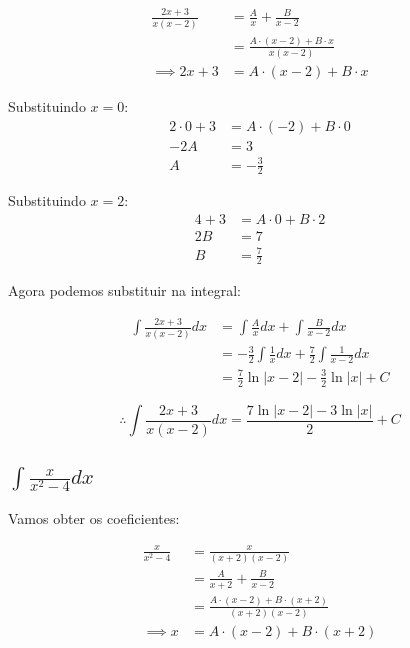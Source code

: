 \documentclass[12pt]{article}
\theoremstyle{definition}
\begin{document}
\begin{align*}
	\frac{2x+3}{x(x-2)}
	              & = \frac{A}{x} + \frac{B}{x-2}            \\
	              & = \frac{A\cdot(x-2) + B \cdot x}{x(x-2)} \\
	\implies 2x+3 & = A\cdot(x-2) + B \cdot x                
\end{align*}

Substituindo \(x = 0\):
\begin{align*}
	2\cdot 0 + 3 & = A\cdot (-2) + B \cdot 0 \\
	-2A          & = 3                       \\
	A            & = -\frac{3}{2}            
\end{align*}

Substituindo \( x = 2\):
\begin{align*}
	4 + 3 & = A \cdot 0 + B\cdot 2 \\
	2B    & = 7                    \\
	B     & = \frac{7}{2}          
\end{align*}

Agora podemos substituir na integral:

\begin{align*}
	\int{\frac{2x+3}{x(x-2)}dx}
	  & = \int{\frac{A}{x}dx}+\int{\frac{B}{x-2}dx}                        \\
	  & = -\frac{3}{2}\int{\frac{1}{x}dx}+\frac{7}{2}\int{\frac{1}{x-2}dx} \\
	  & = \frac{7}{2}\ln{|x-2|} - \frac{3}{2}\ln{|x|} + C                  
\end{align*}

\[
	\boxed{
		\therefore \int{\frac{2x+3}{x(x-2)}dx} = \frac{7\ln{|x-2|}-3\ln{|x|}}{2} + C
	}
\]

\subsection{\(\int{\frac{x}{x^2 - 4}dx}\)}
Vamos obter os coeficientes:

\begin{align*}
    \frac{x}{x^2-4}
    &= \frac{x}{(x+2)(x-2)} \\
    &= \frac{A}{x+2} + \frac{B}{x-2} \\
    &= \frac{A\cdot (x-2) + B\cdot (x+2)}{(x+2)(x-2)} \\
    \implies x
    &= A \cdot (x-2) + B \cdot (x+2)
\end{align*}
\end{document}
